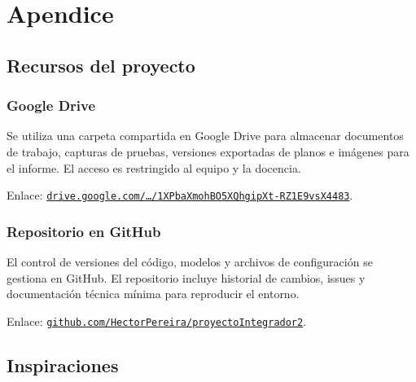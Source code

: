 \newpage
\section{Apendice}


\subsection{Recursos del proyecto}

\subsubsection{Google Drive}
Se utiliza una carpeta compartida en Google Drive para almacenar documentos de trabajo, capturas de pruebas, versiones exportadas de planos e imágenes para el informe. El acceso es restringido al equipo y la docencia. 

Enlace: \href{https://drive.google.com/drive/folders/1XPbaXmohBO5XQhgipXt-RZ1E9vsX4483?usp=sharing}{\texttt{drive.google.com/…/1XPbaXmohBO5XQhgipXt-RZ1E9vsX4483}}.

\subsubsection{Repositorio en GitHub}
El control de versiones del código, modelos y archivos de configuración se gestiona en GitHub. El repositorio incluye historial de cambios, issues y documentación técnica mínima para reproducir el entorno.

Enlace: \href{https://github.com/HectorPereira/proyectoIntegrador2}{\texttt{github.com/HectorPereira/proyectoIntegrador2}}.






\subsection{Inspiraciones}\label{apendice:inspiraciones}

